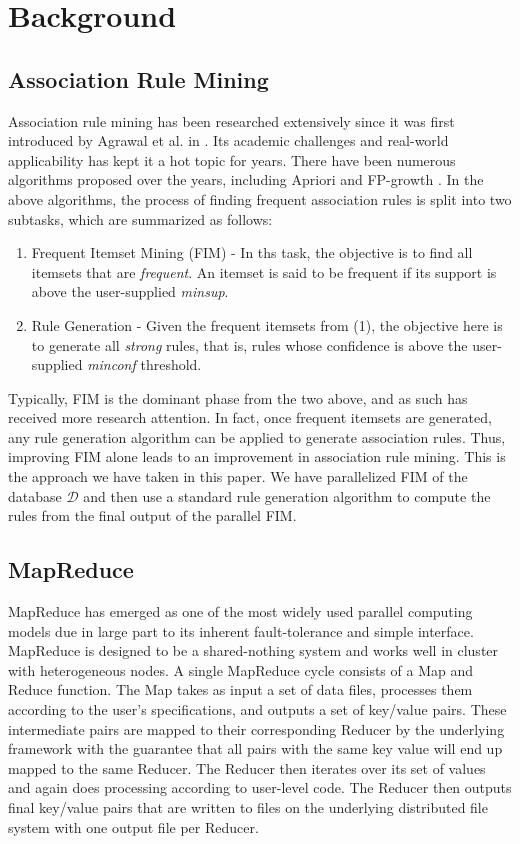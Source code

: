 \documentclass[11pt]{article}
\begin{document}
\section{Background}

\subsection{Association Rule Mining}

Association rule mining has been researched extensively since it was
first introduced by Agrawal et al. in \cite{Agrawal1}. Its academic
challenges and real-world applicability has kept it a hot topic for
years. There have been numerous algorithms proposed over the years,
including Apriori \cite{Agrawal1} and FP-growth \cite{Han}. In the
above algorithms, the process of finding frequent association rules is
split into two subtasks, which are summarized as follows:

\begin{enumerate}
\item Frequent Itemset Mining (FIM) - In ths task, the objective is to
  find all itemsets that are \emph{frequent}. An itemset is said to be
  frequent if its support is above the user-supplied \emph{minsup}. 
\item Rule Generation - Given the frequent itemsets from (1), the
  objective here is to generate all \emph{strong} rules, that is,
  rules whose confidence is above the user-supplied \emph{minconf}
  threshold. 
\end{enumerate}

Typically, FIM is the dominant phase from the two above, and as such
has received more research attention. In fact, once frequent itemsets
are generated, any rule generation algorithm can be applied to
generate association rules. Thus, improving FIM alone leads to an
improvement in association rule mining. This is the approach we have
taken in this paper. We have parallelized FIM of the database
$\mathcal{D}$ and then use a standard rule generation algorithm to
compute the rules from the final output of the parallel FIM. 

\subsection{MapReduce} 

MapReduce has emerged as one of the most widely used parallel
computing models due in large part to its inherent fault-tolerance and
simple interface. MapReduce is designed to be a shared-nothing system
and works well in cluster with heterogeneous nodes. A single MapReduce
cycle consists of a Map and Reduce function. The Map takes as input a
set of data files, processes them according to the user's
specifications, and outputs a set of key/value pairs. These
intermediate pairs are mapped to their corresponding Reducer by the
underlying framework with the guarantee that all pairs with the same
key value will end up mapped to the same Reducer. The Reducer then
iterates over its set of values and again does processing according to
user-level code. The Reducer then outputs final key/value pairs that
are written to files on the underlying distributed file system with
one output file per Reducer. 
\end{document}
